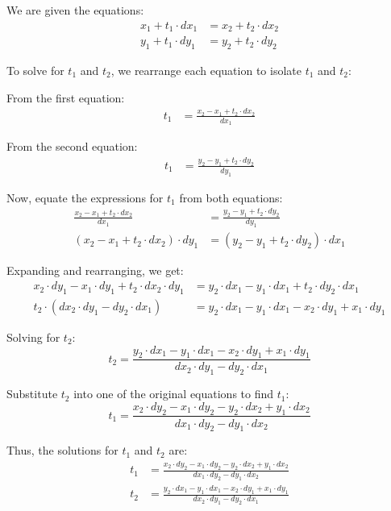 \documentclass{article}
\begin{document}
We are given the equations:
\begin{align}
    x_1 + t_1 \cdot dx_1 &= x_2 + t_2 \cdot dx_2 \\
    y_1 + t_1 \cdot dy_1 &= y_2 + t_2 \cdot dy_2
\end{align}

To solve for \( t_1 \) and \( t_2 \), we rearrange each equation to isolate \( t_1 \) and \( t_2 \):

From the first equation:
\begin{align}
    t_1 &= \frac{x_2 - x_1 + t_2 \cdot dx_2}{dx_1}
\end{align}

From the second equation:
\begin{align}
    t_1 &= \frac{y_2 - y_1 + t_2 \cdot dy_2}{dy_1}
\end{align}

Now, equate the expressions for \( t_1 \) from both equations:
\begin{align}
    \frac{x_2 - x_1 + t_2 \cdot dx_2}{dx_1} &= \frac{y_2 - y_1 + t_2 \cdot dy_2}{dy_1} \\
    (x_2 - x_1 + t_2 \cdot dx_2) \cdot dy_1 &= (y_2 - y_1 + t_2 \cdot dy_2) \cdot dx_1
\end{align}

Expanding and rearranging, we get:
\begin{align}
    x_2 \cdot dy_1 - x_1 \cdot dy_1 + t_2 \cdot dx_2 \cdot dy_1 &= y_2 \cdot dx_1 - y_1 \cdot dx_1 + t_2 \cdot dy_2 \cdot dx_1 \\
    t_2 \cdot (dx_2 \cdot dy_1 - dy_2 \cdot dx_1) &= y_2 \cdot dx_1 - y_1 \cdot dx_1 - x_2 \cdot dy_1 + x_1 \cdot dy_1
\end{align}

Solving for \( t_2 \):
\begin{equation}
    t_2 = \frac{y_2 \cdot dx_1 - y_1 \cdot dx_1 - x_2 \cdot dy_1 + x_1 \cdot dy_1}{dx_2 \cdot dy_1 - dy_2 \cdot dx_1}
\end{equation}

Substitute \( t_2 \) into one of the original equations to find \( t_1 \):
\begin{equation}
    t_1 = \frac{x_2 \cdot dy_2 - x_1 \cdot dy_2 - y_2 \cdot dx_2 + y_1 \cdot dx_2}{dx_1 \cdot dy_2 - dy_1 \cdot dx_2}
\end{equation}

Thus, the solutions for \( t_1 \) and \( t_2 \) are:
\begin{align}
    t_1 &= \frac{x_2 \cdot dy_2 - x_1 \cdot dy_2 - y_2 \cdot dx_2 + y_1 \cdot dx_2}{dx_1 \cdot dy_2 - dy_1 \cdot dx_2} \\
    t_2 &= \frac{y_2 \cdot dx_1 - y_1 \cdot dx_1 - x_2 \cdot dy_1 + x_1 \cdot dy_1}{dx_2 \cdot dy_1 - dy_2 \cdot dx_1}
\end{align}
\end{document}
